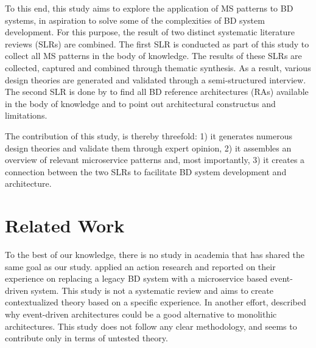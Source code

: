\documentclass[a4paper,11pt,article,oneside]{memoir}
\begin{document}
To this end, this study aims to explore the application of MS patterns to BD systems, in aspiration to solve some of the complexities of BD system development. For this purpose, the result of two distinct systematic literature reviews (SLRs) are combined. The first SLR is conducted as part of this study to collect all MS patterns in the body of knowledge. The results of these SLRs are collected, captured and combined through thematic synthesis. As a result, various design theories are generated and validated through a semi-structured interview. The second SLR is done by \citet{ataei2022state} to find all BD reference architectures (RAs) available in the body of knowledge and to point out architectural constructus and limitations. 



The contribution of this study, is thereby threefold: 
1) it generates numerous design theories and validate them through expert opinion, 2) it assembles an overview of relevant microservice patterns and, most importantly, 3) it creates a connection between the two SLRs to facilitate BD system development and architecture.


\chapter{Related Work}

To the best of our knowledge, there is no study in academia that has shared the same goal as our study. \citet{laigner2020monolithic} applied an action research and reported on their experience on replacing a legacy BD system with a microservice based event-driven system. This study is not a systematic review and aims to create contextualized theory based on a specific experience.  In another effort, \citet{zhelev2019using} described why event-driven architectures could be a good alternative to monolithic architectures. This study does not follow any clear methodology, and seems to contribute only in terms of untested theory.
\end{document}

